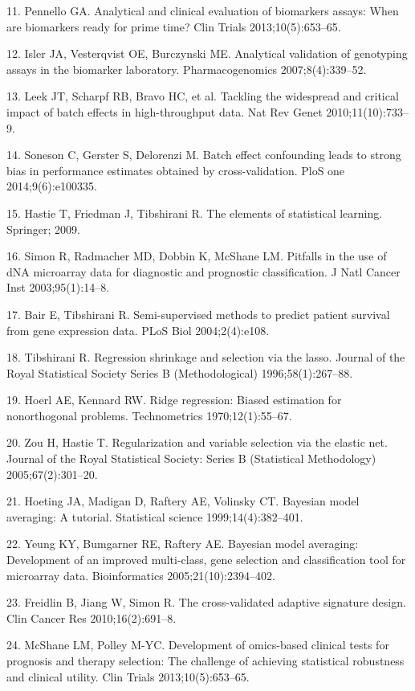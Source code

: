 \documentclass[11pt]{article}
\begin{document}
11. Pennello GA. Analytical and clinical evaluation of biomarkers
assays: When are biomarkers ready for prime time? Clin Trials
2013;10(5):653--65.

12. Isler JA, Vesterqvist OE, Burczynski ME. Analytical validation of
genotyping assays in the biomarker laboratory. Pharmacogenomics
2007;8(4):339--52.

13. Leek JT, Scharpf RB, Bravo HC, et al. Tackling the widespread and
critical impact of batch effects in high-throughput data. Nat Rev Genet
2010;11(10):733--9.

14. Soneson C, Gerster S, Delorenzi M. Batch effect confounding leads to
strong bias in performance estimates obtained by cross-validation. PloS
one 2014;9(6):e100335.

15. Hastie T, Friedman J, Tibshirani R. The elements of statistical
learning. Springer; 2009.

16. Simon R, Radmacher MD, Dobbin K, McShane LM. Pitfalls in the use of
dNA microarray data for diagnostic and prognostic classification. J Natl
Cancer Inst 2003;95(1):14--8.

17. Bair E, Tibshirani R. Semi-supervised methods to predict patient
survival from gene expression data. PLoS Biol 2004;2(4):e108.

18. Tibshirani R. Regression shrinkage and selection via the lasso.
Journal of the Royal Statistical Society Series B (Methodological)
1996;58(1):267--88.

19. Hoerl AE, Kennard RW. Ridge regression: Biased estimation for
nonorthogonal problems. Technometrics 1970;12(1):55--67.

20. Zou H, Hastie T. Regularization and variable selection via the
elastic net. Journal of the Royal Statistical Society: Series B
(Statistical Methodology) 2005;67(2):301--20.

21. Hoeting JA, Madigan D, Raftery AE, Volinsky CT. Bayesian model
averaging: A tutorial. Statistical science 1999;14(4):382--401.

22. Yeung KY, Bumgarner RE, Raftery AE. Bayesian model averaging:
Development of an improved multi-class, gene selection and
classification tool for microarray data. Bioinformatics
2005;21(10):2394--402.

23. Freidlin B, Jiang W, Simon R. The cross-validated adaptive signature
design. Clin Cancer Res 2010;16(2):691--8.

24. McShane LM, Polley M-YC. Development of omics-based clinical tests
for prognosis and therapy selection: The challenge of achieving
statistical robustness and clinical utility. Clin Trials
2013;10(5):653--65.
\end{document}
